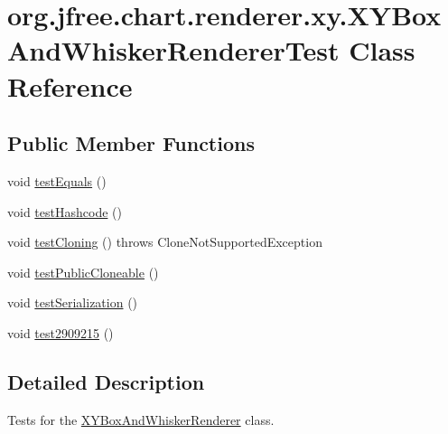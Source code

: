 \hypertarget{classorg_1_1jfree_1_1chart_1_1renderer_1_1xy_1_1_x_y_box_and_whisker_renderer_test}{}\section{org.\+jfree.\+chart.\+renderer.\+xy.\+X\+Y\+Box\+And\+Whisker\+Renderer\+Test Class Reference}
\label{classorg_1_1jfree_1_1chart_1_1renderer_1_1xy_1_1_x_y_box_and_whisker_renderer_test}
\subsection*{Public Member Functions}
\begin{DoxyCompactItemize}
\item 
void \mbox{\hyperlink{classorg_1_1jfree_1_1chart_1_1renderer_1_1xy_1_1_x_y_box_and_whisker_renderer_test_afdb5e8dc001c9ee5783d2b41273e450f}{test\+Equals}} ()
\item 
void \mbox{\hyperlink{classorg_1_1jfree_1_1chart_1_1renderer_1_1xy_1_1_x_y_box_and_whisker_renderer_test_af4519cb1233d0b504500ee9d6bf0446c}{test\+Hashcode}} ()
\item 
void \mbox{\hyperlink{classorg_1_1jfree_1_1chart_1_1renderer_1_1xy_1_1_x_y_box_and_whisker_renderer_test_a42b6fadee88b209d554d4c066ab51918}{test\+Cloning}} ()  throws Clone\+Not\+Supported\+Exception 
\item 
void \mbox{\hyperlink{classorg_1_1jfree_1_1chart_1_1renderer_1_1xy_1_1_x_y_box_and_whisker_renderer_test_a8b51407a496bb8143502a734c3f12b19}{test\+Public\+Cloneable}} ()
\item 
void \mbox{\hyperlink{classorg_1_1jfree_1_1chart_1_1renderer_1_1xy_1_1_x_y_box_and_whisker_renderer_test_a605bf62fd4ba9be55e17493dad5f9693}{test\+Serialization}} ()
\item 
void \mbox{\hyperlink{classorg_1_1jfree_1_1chart_1_1renderer_1_1xy_1_1_x_y_box_and_whisker_renderer_test_a26fac509300a3a1a00a119ec46e21cc0}{test2909215}} ()
\end{DoxyCompactItemize}


\subsection{Detailed Description}
Tests for the \mbox{\hyperlink{classorg_1_1jfree_1_1chart_1_1renderer_1_1xy_1_1_x_y_box_and_whisker_renderer}{X\+Y\+Box\+And\+Whisker\+Renderer}} class. 

